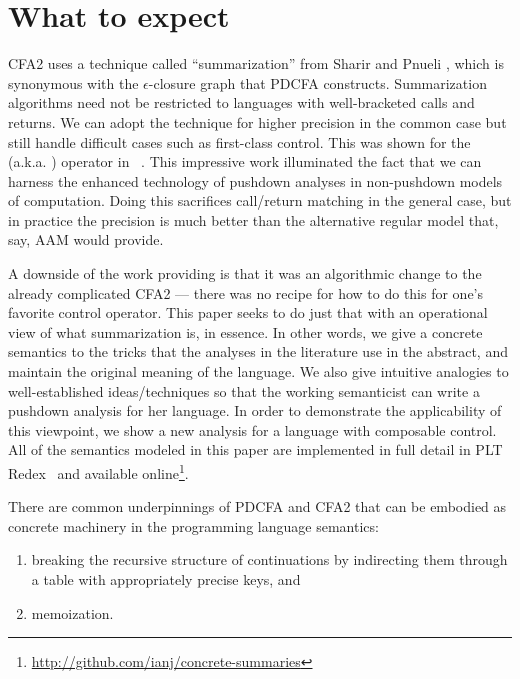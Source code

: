 \section{What to expect}

CFA2 uses a technique called ``summarization'' from Sharir and Pnueli \citep[Chapter 7]{local:muchnick:jones:flow-analysis:1981}, which is synonymous with the $\epsilon$-closure graph that PDCFA constructs.
%
Summarization algorithms need not be restricted to languages with well-bracketed calls and returns.
%
We can adopt the technique for higher precision in the common case but still handle difficult cases such as first-class control.
%
This was shown for the  (a.k.a. ) operator in ~\citet{ianjohnson:Vardoulakis2011Pushdown}.
%
This impressive work illuminated the fact that we can harness the enhanced technology of pushdown analyses in non-pushdown models of computation.
%
Doing this sacrifices call/return matching in the general case, but in practice the precision is much better than the alternative regular model that, say, AAM would provide.

A downside of the work providing  is that it was an algorithmic change to the already complicated CFA2 --- there was no recipe for how to do this for one's favorite control operator.
%
This paper seeks to do just that with an operational view of what summarization is, in essence.
%
In other words, we give a concrete semantics to the tricks that the analyses in the literature use in the abstract, and maintain the original meaning of the language.
%
We also give intuitive analogies to well-established ideas/techniques so that the working semanticist can write a pushdown analysis for her language.
%
In order to demonstrate the applicability of this viewpoint, we show a new analysis for a language with composable control.
%
All of the semantics modeled in this paper are implemented in full detail in PLT Redex~\citep{ianjohnson:Felleisen:2009:SEP:1795772} and available online\footnote{\url{http://github.com/ianj/concrete-summaries}}.

There are common underpinnings of PDCFA and CFA2 that can be embodied as concrete machinery in the programming language semantics: 
\begin{enumerate}
\item{breaking the recursive structure of continuations by indirecting them through a table with appropriately precise keys, and}
\item{memoization.}
\end{enumerate}

